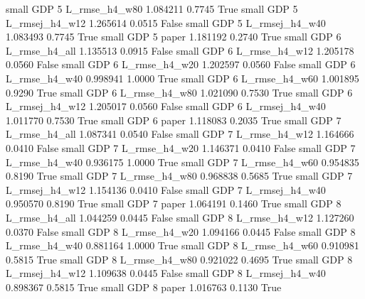      small      GDP                 5  L_rmse_h4_w80   1.084211      0.7745    True
     small      GDP                 5 L_rmsej_h4_w12   1.265614      0.0515   False
     small      GDP                 5 L_rmsej_h4_w40   1.083493      0.7745    True
     small      GDP                 5          paper   1.181192      0.2740    True
     small      GDP                 6  L_rmse_h4_all   1.135513      0.0915   False
     small      GDP                 6  L_rmse_h4_w12   1.205178      0.0560   False
     small      GDP                 6  L_rmse_h4_w20   1.202597      0.0560   False
     small      GDP                 6  L_rmse_h4_w40   0.998941      1.0000    True
     small      GDP                 6  L_rmse_h4_w60   1.001895      0.9290    True
     small      GDP                 6  L_rmse_h4_w80   1.021090      0.7530    True
     small      GDP                 6 L_rmsej_h4_w12   1.205017      0.0560   False
     small      GDP                 6 L_rmsej_h4_w40   1.011770      0.7530    True
     small      GDP                 6          paper   1.118083      0.2035    True
     small      GDP                 7  L_rmse_h4_all   1.087341      0.0540   False
     small      GDP                 7  L_rmse_h4_w12   1.164666      0.0410   False
     small      GDP                 7  L_rmse_h4_w20   1.146371      0.0410   False
     small      GDP                 7  L_rmse_h4_w40   0.936175      1.0000    True
     small      GDP                 7  L_rmse_h4_w60   0.954835      0.8190    True
     small      GDP                 7  L_rmse_h4_w80   0.968838      0.5685    True
     small      GDP                 7 L_rmsej_h4_w12   1.154136      0.0410   False
     small      GDP                 7 L_rmsej_h4_w40   0.950570      0.8190    True
     small      GDP                 7          paper   1.064191      0.1460    True
     small      GDP                 8  L_rmse_h4_all   1.044259      0.0445   False
     small      GDP                 8  L_rmse_h4_w12   1.127260      0.0370   False
     small      GDP                 8  L_rmse_h4_w20   1.094166      0.0445   False
     small      GDP                 8  L_rmse_h4_w40   0.881164      1.0000    True
     small      GDP                 8  L_rmse_h4_w60   0.910981      0.5815    True
     small      GDP                 8  L_rmse_h4_w80   0.921022      0.4695    True
     small      GDP                 8 L_rmsej_h4_w12   1.109638      0.0445   False
     small      GDP                 8 L_rmsej_h4_w40   0.898367      0.5815    True
     small      GDP                 8          paper   1.016763      0.1130    True